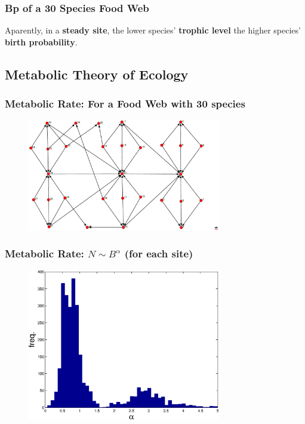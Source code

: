 \documentclass[xcolor=x11names,compress]{beamer}
\renewcommand{\(}{\begin{columns}}
\renewcommand{\)}{\end{columns}}
\newcommand{\<}[1]{\begin{column}{#1}}
\renewcommand{\>}{\end{column}}
\begin{document}
\begin{frame}
\frametitle{Bp of a 30 Species Food Web}
\begin{block}{}
Aparently, in a \textbf{steady site}, the lower species' \textbf{trophic level} the higher species' \textbf{birth probability}. 
\end{block}
\end{frame}



\subsection{Metabolic Theory of Ecology}

\begin{frame}
\frametitle{Metabolic Rate: For a Food Web with 30 species}
\begin{figure}
  \includegraphics[width=0.75\textwidth]{./FoodWeb_30bloques9}
\end{figure}
\end{frame}

\begin{frame}
\frametitle{Metabolic Rate: $N \sim B^{\alpha}$ (for each site)}
\begin{figure}
  \includegraphics[width=0.75\textwidth]{./alpha_distr}
\end{figure}
\end{frame}
\end{document}
